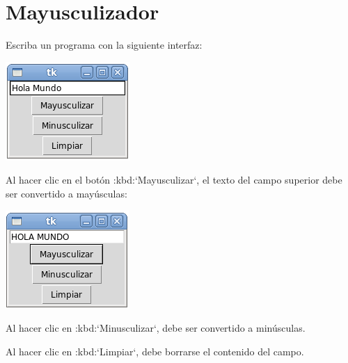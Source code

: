 \section{Mayusculizador}

Escriba un programa con la siguiente interfaz:

\includegraphics{../../diapos/programas/tkinter/capturas/07-0.png}

Al hacer clic en el botón :kbd:`Mayusculizar`, el texto del campo
superior debe ser convertido a mayúsculas:

\includegraphics{../../diapos/programas/tkinter/capturas/07-1.png}

Al hacer clic en :kbd:`Minusculizar`, debe ser convertido a minúsculas.

Al hacer clic en :kbd:`Limpiar`, debe borrarse el contenido del campo.
